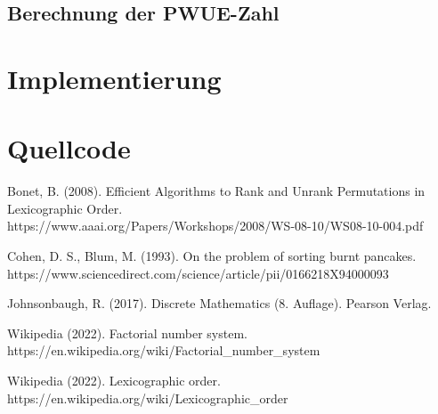 \documentclass[a4paper, 11pt, ngerman]{article}
\begin{document}
\subsection{Berechnung der PWUE-Zahl}

\section{Implementierung}

\section{Quellcode}

\begin{thebibliography}{5}
    Bonet, B. (2008).
    Efficient Algorithms to Rank and Unrank Permutations in Lexicographic Order. \\
    https://www.aaai.org/Papers/Workshops/2008/WS-08-10/WS08-10-004.pdf

    Cohen, D. S., Blum, M. (1993).
    On the problem of sorting burnt pancakes. \\
    https://www.sciencedirect.com/science/article/pii/0166218X94000093

    Johnsonbaugh, R. (2017).
    Discrete Mathematics (8. Auflage).
    Pearson Verlag.

    Wikipedia (2022).
    Factorial number system. \\
    https://en.wikipedia.org/wiki/Factorial\_number\_system

    Wikipedia (2022).
    Lexicographic order. \\
    https://en.wikipedia.org/wiki/Lexicographic\_order
\end{thebibliography}
\end{document}
